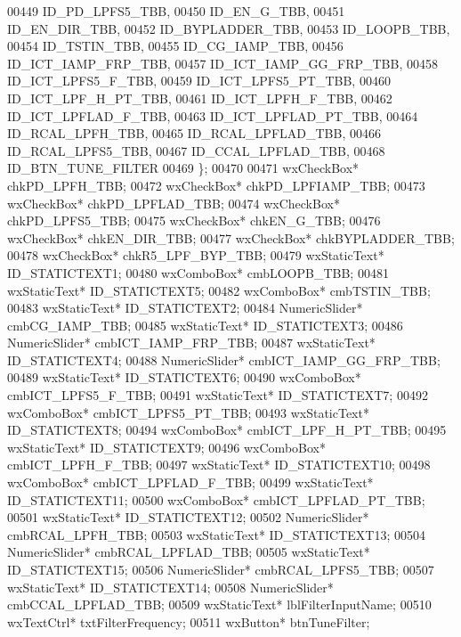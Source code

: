 \begin{DoxyCode}
00449             ID_PD_LPFS5_TBB,
00450             ID_EN_G_TBB,
00451             ID_EN_DIR_TBB,
00452             ID_BYPLADDER_TBB,
00453             ID_LOOPB_TBB,
00454             ID_TSTIN_TBB,
00455             ID_CG_IAMP_TBB,
00456             ID_ICT_IAMP_FRP_TBB,
00457             ID_ICT_IAMP_GG_FRP_TBB,
00458             ID_ICT_LPFS5_F_TBB,
00459             ID_ICT_LPFS5_PT_TBB,
00460             ID_ICT_LPF_H_PT_TBB,
00461             ID_ICT_LPFH_F_TBB,
00462             ID_ICT_LPFLAD_F_TBB,
00463             ID_ICT_LPFLAD_PT_TBB,
00464             ID_RCAL_LPFH_TBB,
00465             ID_RCAL_LPFLAD_TBB,
00466             ID_RCAL_LPFS5_TBB,
00467             ID_CCAL_LPFLAD_TBB,
00468             ID\_BTN\_TUNE\_FILTER
00469         \};
00470         
00471         wxCheckBox* chkPD_LPFH_TBB;
00472         wxCheckBox* chkPD_LPFIAMP_TBB;
00473         wxCheckBox* chkPD_LPFLAD_TBB;
00474         wxCheckBox* chkPD_LPFS5_TBB;
00475         wxCheckBox* chkEN_G_TBB;
00476         wxCheckBox* chkEN_DIR_TBB;
00477         wxCheckBox* chkBYPLADDER_TBB;
00478         wxCheckBox* chkR5_LPF_BYP_TBB;
00479         wxStaticText* ID_STATICTEXT1;
00480         wxComboBox* cmbLOOPB_TBB;
00481         wxStaticText* ID_STATICTEXT5;
00482         wxComboBox* cmbTSTIN_TBB;
00483         wxStaticText* ID_STATICTEXT2;
00484         NumericSlider* cmbCG_IAMP_TBB;
00485         wxStaticText* ID_STATICTEXT3;
00486         NumericSlider* cmbICT_IAMP_FRP_TBB;
00487         wxStaticText* ID_STATICTEXT4;
00488         NumericSlider* cmbICT_IAMP_GG_FRP_TBB;
00489         wxStaticText* ID_STATICTEXT6;
00490         wxComboBox* cmbICT_LPFS5_F_TBB;
00491         wxStaticText* ID_STATICTEXT7;
00492         wxComboBox* cmbICT_LPFS5_PT_TBB;
00493         wxStaticText* ID_STATICTEXT8;
00494         wxComboBox* cmbICT_LPF_H_PT_TBB;
00495         wxStaticText* ID_STATICTEXT9;
00496         wxComboBox* cmbICT_LPFH_F_TBB;
00497         wxStaticText* ID_STATICTEXT10;
00498         wxComboBox* cmbICT_LPFLAD_F_TBB;
00499         wxStaticText* ID_STATICTEXT11;
00500         wxComboBox* cmbICT_LPFLAD_PT_TBB;
00501         wxStaticText* ID_STATICTEXT12;
00502         NumericSlider* cmbRCAL_LPFH_TBB;
00503         wxStaticText* ID_STATICTEXT13;
00504         NumericSlider* cmbRCAL_LPFLAD_TBB;
00505         wxStaticText* ID_STATICTEXT15;
00506         NumericSlider* cmbRCAL_LPFS5_TBB;
00507         wxStaticText* ID_STATICTEXT14;
00508         NumericSlider* cmbCCAL_LPFLAD_TBB;
00509         wxStaticText* lblFilterInputName;
00510         wxTextCtrl* txtFilterFrequency;
00511         wxButton* btnTuneFilter;

\end{DoxyCode}
